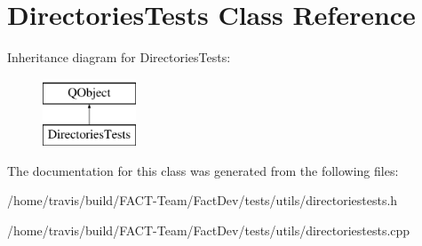 \hypertarget{classDirectoriesTests}{\section{Directories\-Tests Class Reference}
\label{classDirectoriesTests}
}
Inheritance diagram for Directories\-Tests\-:\begin{figure}[H]
\begin{center}
\leavevmode
\includegraphics[height=2.000000cm]{df/d18/classDirectoriesTests}
\end{center}
\end{figure}


The documentation for this class was generated from the following files\-:\begin{DoxyCompactItemize}
\item 
/home/travis/build/\-F\-A\-C\-T-\/\-Team/\-Fact\-Dev/tests/utils/directoriestests.\-h\item 
/home/travis/build/\-F\-A\-C\-T-\/\-Team/\-Fact\-Dev/tests/utils/directoriestests.\-cpp\end{DoxyCompactItemize}
